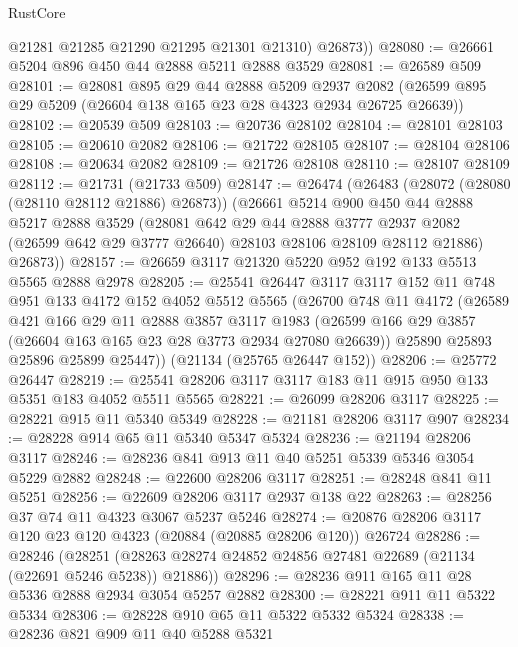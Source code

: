 \begin{lexlean}{RustCore}
\begin{coremodule}
          @21281
          @21285
          @21290
          @21295
          @21301
          @21310)
        @26873))
@28080 := @26661 @5204 @896 @450 @44 @2888 @5211 @2888 @3529
@28081 := @26589 @509
@28101 := @28081
    @895
    @29
    @44
    @2888
    @5209
    @2937
    @2082
    (@26599 @895 @29 @5209 (@26604 @138 @165 @23 @28 @4323 @2934 @26725 @26639))
@28102 := @20539 @509
@28103 := @20736 @28102
@28104 := @28101 @28103
@28105 := @20610 @2082
@28106 := @21722 @28105
@28107 := @28104 @28106
@28108 := @20634 @2082
@28109 := @21726 @28108
@28110 := @28107 @28109
@28112 := @21731 (@21733 @509)
@28147 := @26474
    (@26483
      (@28072 (@28080 (@28110 @28112 @21886) @26873))
      (@26661
        @5214
        @900
        @450
        @44
        @2888
        @5217
        @2888
        @3529
        (@28081
          @642
          @29
          @44
          @2888
          @3777
          @2937
          @2082
          (@26599 @642 @29 @3777 @26640)
          @28103
          @28106
          @28109
          @28112
          @21886)
        @26873))
@28157 := @26659 @3117 @21320 @5220 @952 @192 @133 @5513 @5565 @2888 @2978
@28205 := @25541
    @26447
    @3117
    @3117
    @152
    @11
    @748
    @951
    @133
    @4172
    @152
    @4052
    @5512
    @5565
    (@26700
      @748
      @11
      @4172
      (@26589
        @421
        @166
        @29
        @11
        @2888
        @3857
        @3117
        @1983
        (@26599 @166 @29 @3857 (@26604 @163 @165 @23 @28 @3773 @2934 @27080 @26639))
        @25890
        @25893
        @25896
        @25899
        @25447))
    (@21134 (@25765 @26447 @152))
@28206 := @25772 @26447
@28219 := @25541 @28206 @3117 @3117 @183 @11 @915 @950 @133 @5351 @183 @4052 @5511 @5565
@28221 := @26099 @28206 @3117
@28225 := @28221 @915 @11 @5340 @5349
@28228 := @21181 @28206 @3117 @907
@28234 := @28228 @914 @65 @11 @5340 @5347 @5324
@28236 := @21194 @28206 @3117
@28246 := @28236 @841 @913 @11 @40 @5251 @5339 @5346 @3054 @5229 @2882
@28248 := @22600 @28206 @3117
@28251 := @28248 @841 @11 @5251
@28256 := @22609 @28206 @3117 @2937 @138 @22
@28263 := @28256 @37 @74 @11 @4323 @3067 @5237 @5246
@28274 := @20876 @28206 @3117 @120 @23 @120 @4323 (@20884 (@20885 @28206 @120)) @26724
@28286 := @28246
    (@28251 (@28263 @28274 @24852 @24856 @27481 @22689 (@21134 (@22691 @5246 @5238)) @21886))
@28296 := @28236 @911 @165 @11 @28 @5336 @2888 @2934 @3054 @5257 @2882
@28300 := @28221 @911 @11 @5322 @5334
@28306 := @28228 @910 @65 @11 @5322 @5332 @5324
@28338 := @28236
    @821
    @909
    @11
    @40
    @5288
    @5321

\end{coremodule}
\end{lexlean}

